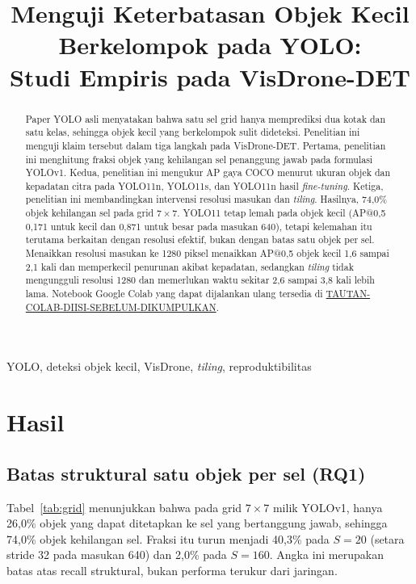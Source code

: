 \documentclass[conference,a4paper]{IEEEtran}
\begin{document}
\renewcommand{\IEEEkeywordsname}{Kata Kunci}
\renewcommand{\abstractname}{Abstrak}
\title{Menguji Keterbatasan Objek Kecil Berkelompok pada YOLO:\\Studi Empiris pada VisDrone-DET}

\author{
}
\maketitle

\begin{abstract}
Paper YOLO asli menyatakan bahwa satu sel grid hanya memprediksi dua kotak dan satu kelas, sehingga objek kecil yang berkelompok sulit dideteksi. Penelitian ini menguji klaim tersebut dalam tiga langkah pada VisDrone-DET. Pertama, penelitian ini menghitung fraksi objek yang kehilangan sel penanggung jawab pada formulasi YOLOv1. Kedua, penelitian ini mengukur AP gaya COCO menurut ukuran objek dan kepadatan citra pada YOLO11n, YOLO11s, dan YOLO11n hasil \textit{fine-tuning}. Ketiga, penelitian ini membandingkan intervensi resolusi masukan dan \textit{tiling}. Hasilnya, 74,0\% objek kehilangan sel pada grid $7\times7$. YOLO11 tetap lemah pada objek kecil (AP@0,5 0,171 untuk kecil dan 0,871 untuk besar pada masukan 640), tetapi kelemahan itu terutama berkaitan dengan resolusi efektif, bukan dengan batas satu objek per sel. Menaikkan resolusi masukan ke 1280 piksel menaikkan AP@0,5 objek kecil 1,6 sampai 2,1 kali dan memperkecil penurunan akibat kepadatan, sedangkan \textit{tiling} tidak mengungguli resolusi 1280 dan memerlukan waktu sekitar 2,6 sampai 3,8 kali lebih lama. Notebook Google Colab yang dapat dijalankan ulang tersedia di \url{TAUTAN-COLAB-DIISI-SEBELUM-DIKUMPULKAN}.
\end{abstract}

\begin{IEEEkeywords}
YOLO, deteksi objek kecil, VisDrone, \textit{tiling}, reproduktibilitas
\end{IEEEkeywords}



\section{Hasil}
\subsection{Batas struktural satu objek per sel (RQ1)}
Tabel~\ref{tab:grid} menunjukkan bahwa pada grid $7\times7$ milik YOLOv1, hanya 26,0\% objek yang dapat ditetapkan ke sel yang bertanggung jawab, sehingga 74,0\% objek kehilangan sel. Fraksi itu turun menjadi 40,3\% pada $S=20$ (setara stride 32 pada masukan 640) dan 2,0\% pada $S=160$. Angka ini merupakan batas atas recall struktural, bukan performa terukur dari jaringan.
\end{document}
